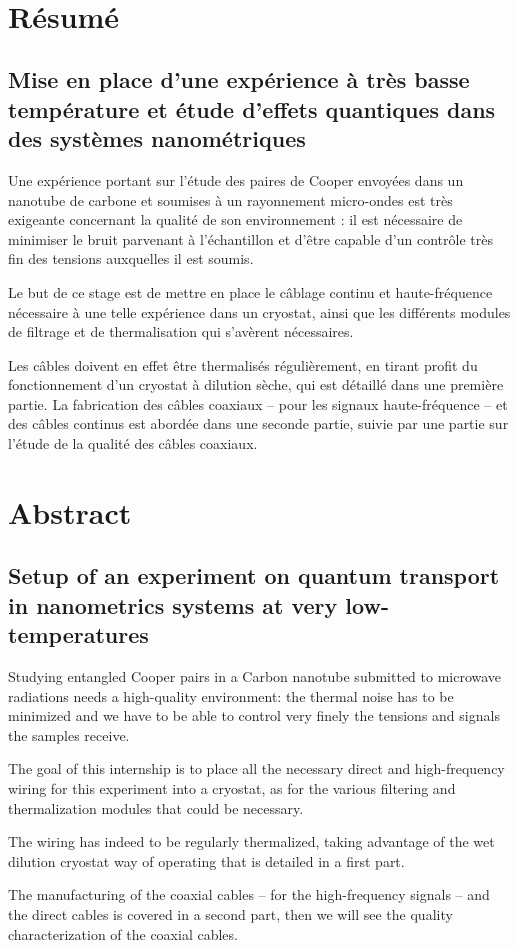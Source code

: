 ~ %
\vfill

\section*{Résumé}

\subsection*{Mise en place d'une expérience à très basse température et étude d'effets quantiques dans des systèmes nanométriques}

Une expérience portant sur l'étude des paires de Cooper envoyées dans un nanotube de carbone et soumises à un rayonnement micro-ondes est très exigeante concernant la qualité de son environnement : il est nécessaire de minimiser le bruit parvenant à l'échantillon et d'être capable d'un contrôle très fin des tensions auxquelles il est soumis.

Le but de ce stage est de mettre en place le câblage continu et haute-fréquence nécessaire à une telle expérience dans un cryostat, ainsi que les différents modules de filtrage et de thermalisation qui s'avèrent nécessaires.

Les câbles doivent en effet être thermalisés régulièrement, en tirant profit du fonctionnement d'un cryostat à dilution sèche, qui est détaillé dans une première partie.
La fabrication des câbles coaxiaux -- pour les signaux haute-fréquence -- et des câbles continus est abordée dans une seconde partie, suivie par une partie sur l'étude de la qualité des câbles coaxiaux.



\section*{Abstract}

\subsection*{Setup of an experiment on quantum transport in nanometrics systems at very low-temperatures}

Studying entangled Cooper pairs in a Carbon nanotube submitted to microwave radiations needs a high-quality environment: the thermal noise has to be minimized and we have to be able to control very finely the tensions and signals the samples receive.

The goal of this internship is to place all the necessary direct and high-frequency wiring for this experiment into a cryostat, as for the various filtering and thermalization modules that could be necessary.

The wiring has indeed to be regularly thermalized, taking advantage of the wet dilution cryostat way of operating that is detailed in a first part.

The manufacturing of the coaxial cables -- for the high-frequency signals -- and the direct cables is covered in a second part, then we will see the quality characterization of the coaxial cables.
\vfill
